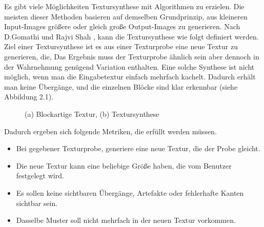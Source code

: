 \documentclass[12pt, a4paper,twoside,openright]{report} %
\begin{document}
Es gibt viele Möglichkeiten Textursynthese mit Algorithmen zu erzielen.
Die meisten dieser Methoden basieren auf demselben Grundprinzip, aus kleineren Input-Images größere oder gleich große Output-Images zu generieren.
Nach D.Gomathi und Rajvi Shah \cite[S.1]{GomathiShah2009}, kann die Textursynthese wie folgt definiert werden.
\newline
Ziel einer Textursynthese ist es aus einer Texturprobe eine neue Textur zu generieren, die, 
Das Ergebnis muss der Texturprobe ähnlich sein aber dennoch in der Wahrnehmung genügend Variation enthalten.
Eine solche Synthese ist nicht möglich, wenn man die Eingabetextur einfach mehrfach kachelt.
Dadurch erhält man keine  Übergänge, und die einzelnen Blöcke sind klar erkennbar {(siehe Abbildung 2.1)}.

\begin{figure}[H]
    \centering
    \qquad
    \caption{(a) Blockartige Textur, (b) Textursynthese}%
\end{figure}

\noindent Dadurch ergeben sich folgende Metriken, die erfüllt werden müssen.

\begin{itemize}
    \item Bei gegebener Texturprobe, generiere eine neue Textur, die der Probe gleicht.
    \item Die neue Textur kann eine beliebige Größe haben, die vom Benutzer festgelegt wird.
    \item Es sollen keine sichtbaren Übergänge, Artefakte oder fehlerhafte Kanten sichtbar sein.
    \item Dasselbe Muster soll nicht mehrfach in der neuen Textur vorkommen. \cite[S.2]{GomathiShah2009}
\end{itemize}
\end{document}
